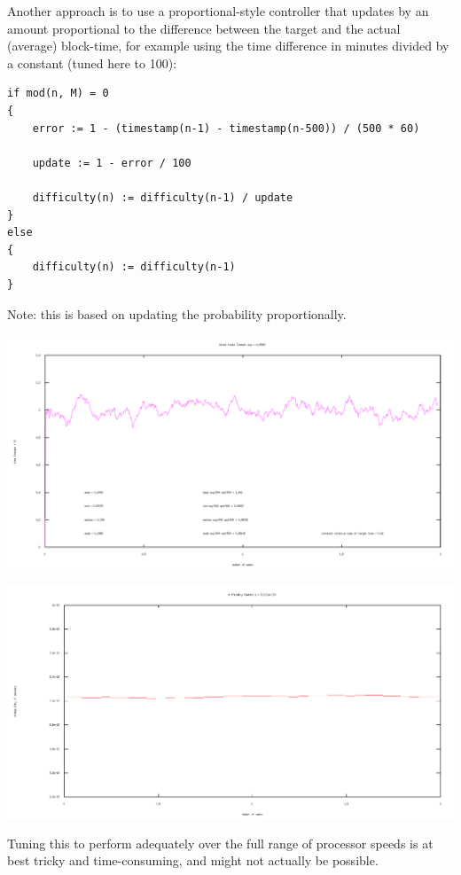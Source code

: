 \documentclass[10pt,a4paper]{article}
\begin{document}
\newpage

Another approach is to use a proportional-style controller that updates by an amount proportional to the difference between the target and the actual (average) block-time, for example using the time difference in minutes divided by a constant (tuned here to 100):

\begin{verbatim}
if mod(n, M) = 0
{
    error := 1 - (timestamp(n-1) - timestamp(n-500)) / (500 * 60)
        
    update := 1 - error / 100

    difficulty(n) := difficulty(n-1) / update
}
else
{
    difficulty(n) := difficulty(n-1)
}
\end{verbatim}
Note: this is based on updating the probability proportionally.

\includegraphics[width=14cm]{Diagrams/SimulationGraphs/simulation_avg-500_upd-500_Pcontroller.png}

\includegraphics[width=14cm]{Diagrams/SimulationGraphs/simulation_avg-500_upd-500_Pcontroller_diff.png}

Tuning this to perform adequately over the full range of processor speeds is at best tricky and time-consuming, and might not actually be possible.
\end{document}
